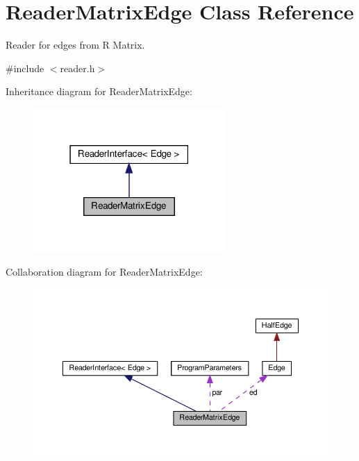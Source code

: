 \hypertarget{classReaderMatrixEdge}{}\section{Reader\+Matrix\+Edge Class Reference}
\label{classReaderMatrixEdge}


Reader for edges from R Matrix.  




{\ttfamily \#include $<$reader.\+h$>$}



Inheritance diagram for Reader\+Matrix\+Edge\+:\nopagebreak
\begin{figure}[H]
\begin{center}
\leavevmode
\includegraphics[width=207pt]{classReaderMatrixEdge__inherit__graph}
\end{center}
\end{figure}


Collaboration diagram for Reader\+Matrix\+Edge\+:
\nopagebreak
\begin{figure}[H]
\begin{center}
\leavevmode
\includegraphics[width=350pt]{classReaderMatrixEdge__coll__graph}
\end{center}
\end{figure}
